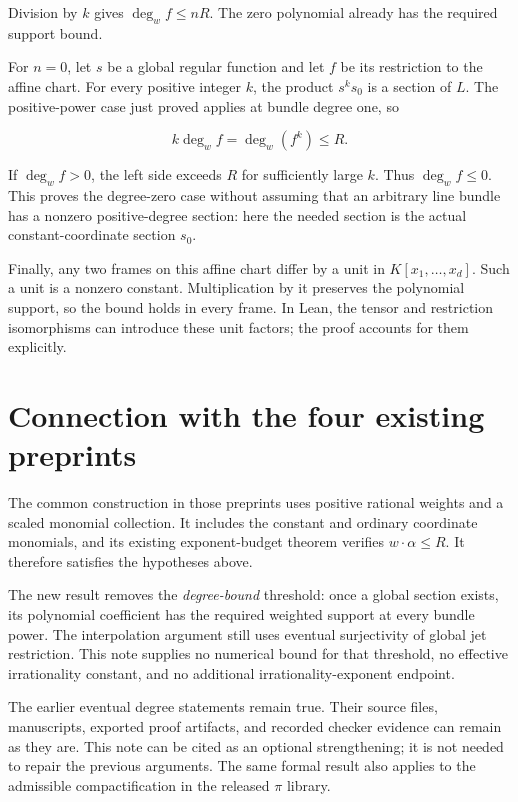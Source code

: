 \documentclass[11pt]{article}
\begin{document}
Division by \(k\) gives \(\deg_w f\leq nR\). The zero polynomial already has the required support bound.

For \(n=0\), let \(s\) be a global regular function and let \(f\) be its restriction to the affine chart. For every positive integer \(k\), the product \(s^k s_0\) is a section of \(L\). The positive-power case just proved applies at bundle degree one, so

\[
k\deg_w f=\deg_w(f^k)\leq R.
\]

If \(\deg_w f>0\), the left side exceeds \(R\) for sufficiently large \(k\). Thus \(\deg_w f\leq0\). This proves the degree-zero case without assuming that an arbitrary line bundle has a nonzero positive-degree section: here the needed section is the actual constant-coordinate section \(s_0\).

Finally, any two frames on this affine chart differ by a unit in \(K[x_1,\ldots,x_d]\). Such a unit is a nonzero constant. Multiplication by it preserves the polynomial support, so the bound holds in every frame. In Lean, the tensor and restriction isomorphisms can introduce these unit factors; the proof accounts for them explicitly.

\section{Connection with the four existing preprints}

The common construction in those preprints uses positive rational weights and a scaled monomial collection. It includes the constant and ordinary coordinate monomials, and its existing exponent-budget theorem verifies \(w\cdot\alpha\leq R\). It therefore satisfies the hypotheses above.

The new result removes the \emph{degree-bound} threshold: once a global section exists, its polynomial coefficient has the required weighted support at every bundle power. The interpolation argument still uses eventual surjectivity of global jet restriction. This note supplies no numerical bound for that threshold, no effective irrationality constant, and no additional irrationality-exponent endpoint.

The earlier eventual degree statements remain true. Their source files, manuscripts, exported proof artifacts, and recorded checker evidence can remain as they are. This note can be cited as an optional strengthening; it is not needed to repair the previous arguments. The same formal result also applies to the admissible compactification in the released $\pi$ library.
\end{document}
